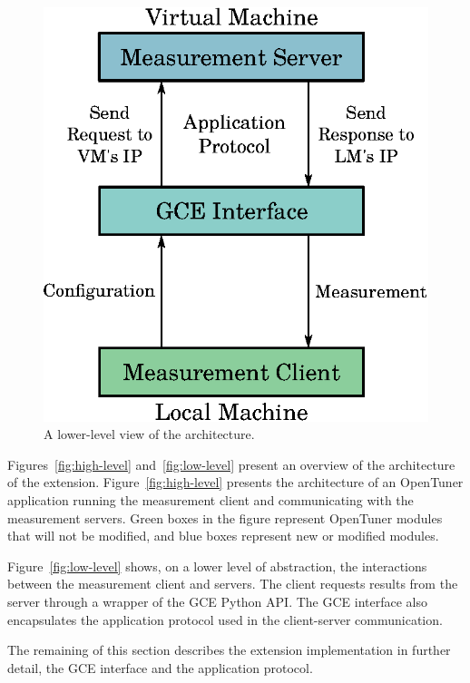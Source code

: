 \documentclass[a4paper, 12pt]{article}
\begin{document}
\begin{figure}[htpb]
\begin{minipage}{.45\textwidth}
        \includegraphics[scale=.64]{low-level-implementation}
        \caption{A lower-level view of the architecture.}
        \label{fig:low-level}
    \end{minipage}%
    \label{fig:archs}
\end{figure}

Figures~\ref{fig:high-level} and~\ref{fig:low-level} present an
overview of the architecture of the extension.
Figure~\ref{fig:high-level} presents the architecture of an OpenTuner
application running the measurement client and communicating with the
measurement servers.  Green boxes in the figure represent OpenTuner modules
that will not be modified, and blue boxes represent new or modified modules.

Figure~\ref{fig:low-level} shows, on a lower level of abstraction, the
interactions between the measurement client and servers. The client
requests results from the server through a wrapper of the GCE Python API.
The GCE interface also encapsulates the application protocol used in
the client-server communication.

The remaining of this section describes the extension implementation in further
detail, the GCE interface and the application protocol.
\end{document}
